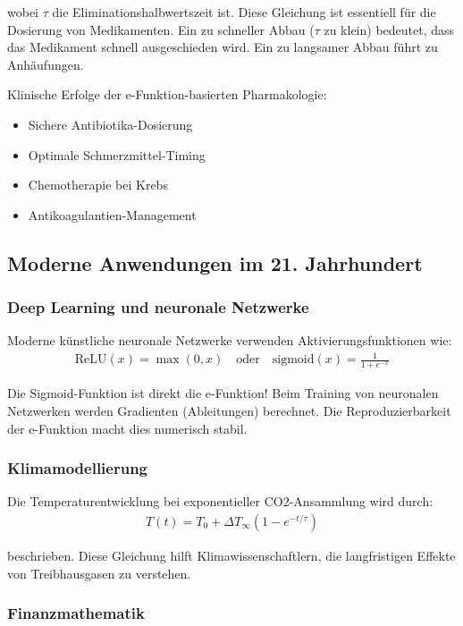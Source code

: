 \documentclass[a4paper,12pt,twoside]{report}
\theoremstyle{definition}
\begin{document}
wobei $\tau$ die Eliminationshalbwertszeit ist. Diese Gleichung ist essentiell für die Dosierung von Medikamenten. Ein zu schneller Abbau ($\tau$ zu klein) bedeutet, dass das Medikament schnell ausgeschieden wird. Ein zu langsamer Abbau führt zu Anhäufungen.

Klinische Erfolge der e-Funktion-basierten Pharmakologie:
\begin{itemize}
	\item[-] Sichere Antibiotika-Dosierung
	\item[-] Optimale Schmerzmittel-Timing
	\item[-] Chemotherapie bei Krebs
	\item[-] Antikoagulantien-Management
\end{itemize}

\subsection{Moderne Anwendungen im 21. Jahrhundert}

\subsubsection*{Deep Learning und neuronale Netzwerke}

Moderne künstliche neuronale Netzwerke verwenden Aktivierungsfunktionen wie:
\begin{align}
	\text{ReLU}(x) = \max(0, x) \quad \text{oder} \quad \text{sigmoid}(x) = \frac{1}{1 + e^{-x}}
\end{align}

Die Sigmoid-Funktion ist direkt die e-Funktion! Beim Training von neuronalen Netzwerken werden Gradienten (Ableitungen) berechnet. Die Reproduzierbarkeit der e-Funktion macht dies numerisch stabil.

\subsubsection*{Klimamodellierung}

Die Temperaturentwicklung bei exponentieller CO2-Ansammlung wird durch:
\begin{align}
	T(t) = T_0 + \Delta T_{\infty} (1 - e^{-t/\tau})
\end{align}

beschrieben. Diese Gleichung hilft Klimawissenschaftlern, die langfristigen Effekte von Treibhausgasen zu verstehen.

\subsubsection*{Finanzmathematik}
\end{document}
